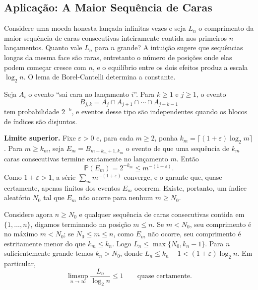 \documentclass[12pt,portuguese]{article}
\theoremstyle{definition}
\theoremstyle{plainexercise}
\theoremstyle{starredexercise}
\theoremstyle{definition}
\begin{document}
\subsection{Aplicação: A Maior Sequência de Caras}\label{subsec:maior-sequencia}

Considere uma moeda honesta lançada infinitas vezes e seja $L_n$ o comprimento
da maior sequência de caras consecutivas inteiramente contida nos primeiros $n$
lançamentos. Quanto vale $L_n$ para $n$ grande? A intuição sugere que
sequências longas da mesma face são raras, entretanto o número de posições onde elas podem começar
cresce com $n$, e o equilíbrio entre os dois efeitos produz a escala
$\log_2 n$. O lema de Borel-Cantelli determina a constante.

Seja $A_i$ o evento ``sai cara no lançamento $i$''. Para $k\geqslant1$ e
$j\geqslant1$, o evento
\[
B_{j,k}=A_j\cap A_{j+1}\cap\cdots\cap A_{j+k-1}
\]
tem probabilidade $2^{-k}$, e eventos desse tipo são independentes quando os
blocos de índices são disjuntos.

\smallskip
\noindent\textbf{Limite superior.}
Fixe $\varepsilon>0$ e, para cada $m\geqslant2$, ponha
$k_m=\lceil(1+\varepsilon)\log_2 m\rceil$. Para $m\geqslant k_m$, seja
$E_m=B_{m-k_m+1,k_m}$ o evento de que uma sequência de $k_m$ caras consecutivas
termine exatamente no lançamento $m$. Então
\[
\mathbb{P}(E_m)
=
2^{-k_m}
\leqslant
m^{-(1+\varepsilon)}.
\]
Como $1+\varepsilon>1$, a série $\sum_{m}m^{-(1+\varepsilon)}$ converge, e o
 garante que, quase certamente, apenas finitos dos eventos $E_m$
ocorrem. Existe, portanto, um índice aleatório $N_0$ tal que $E_m$ não ocorre
para nenhum $m\geqslant N_0$.

Considere agora $n\geqslant N_0$ e qualquer sequência de caras consecutivas
contida em $\{1,\ldots,n\}$, digamos terminando na posição $m\leqslant n$. Se
$m<N_0$, seu comprimento é no máximo $m<N_0$; se $N_0\leqslant m\leqslant n$,
como $E_m$ não ocorre, seu comprimento é estritamente menor do que
$k_m\leqslant k_n$. Logo $L_n\leqslant\max\{N_0,k_n-1\}$. Para $n$
suficientemente grande temos $k_n>N_0$, donde
$L_n\leqslant k_n-1<(1+\varepsilon)\log_2 n$. Em particular,
\[
\limsup_{n\to\infty}\frac{L_n}{\log_2 n}\leqslant1
\qquad
\text{quase certamente}.
\]
\end{document}
